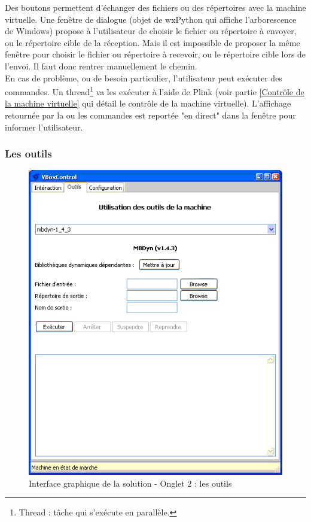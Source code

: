 Des boutons permettent d'échanger des fichiers ou des répertoires avec la machine virtuelle.
Une fenêtre de dialogue (objet de wxPython qui affiche l'arborescence de Windows) propose à l'utilisateur de choisir le fichier ou répertoire à envoyer, ou le répertoire cible de la réception.
Mais il est impossible de proposer la même fenêtre pour choisir le fichier ou répertoire à recevoir, ou le répertoire cible lors de l'envoi.
Il faut donc rentrer manuellement le chemin.
\\


En cas de problème, ou de besoin particulier, l'utilisateur peut exécuter des commandes.
Un thread\footnote{Thread : tâche qui s'exécute en parallèle.} va les exécuter à l'aide de Plink (voir partie \ref{Contrôle de la machine virtuelle} qui détail le contrôle de la machine virtuelle).
L'affichage retournée par la ou les commandes est reportée "en direct" dans la fenêtre pour informer l'utilisateur. 
\\




\subsubsection{Les outils}

\begin{figure}[!h]
	\center
	\includegraphics[scale=0.6]{images/Interface_solution_2.png}
	\caption{Interface graphique de la solution - Onglet 2 : les outils}
	\label{Interface graphique de la solution - Onglet 2 : les outils}
\end{figure}


